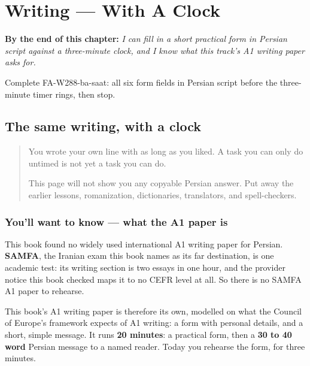 
\chapter{Writing --- With A Clock}
\label{ch:fa-with-a-clock}

\begin{chapteropening}
\textbf{By the end of this chapter:} \emph{I can fill in a short practical form in Persian script against a three-minute clock, and I know what this track's A1 writing paper asks for.}

Complete FA-W288-ba-saat: all six form fields in Persian script before the three-minute timer rings, then stop.
\end{chapteropening}

\section[(short timed A1 writing checkpoint)]{The same writing, with a clock}

\label{lesson:FA-W288-ba-saat}



\begin{quote}
You wrote your own line with as long as you liked. A task you can only do untimed is not yet a task you can do.

This page will not show you any copyable Persian answer. Put away the earlier lessons, romanization, dictionaries, translators, and spell-checkers.
\end{quote}

\subsection*{You'll want to know — what the A1 paper is}
This book found no widely used international A1 writing paper for Persian. \textbf{SAMFA}, the Iranian exam this book names as its far destination, is one academic test: its writing section is two essays in one hour, and the provider notice this book checked maps it to no CEFR level at all. So there is no SAMFA A1 paper to rehearse.

This book's A1 writing paper is therefore its own, modelled on what the Council of Europe's framework expects of A1 writing: a form with personal details, and a short, simple message. It runs \textbf{20 minutes}: a practical form, then a \textbf{30 to 40 word} Persian message to a named reader. Today you rehearse the form, for three minutes.

